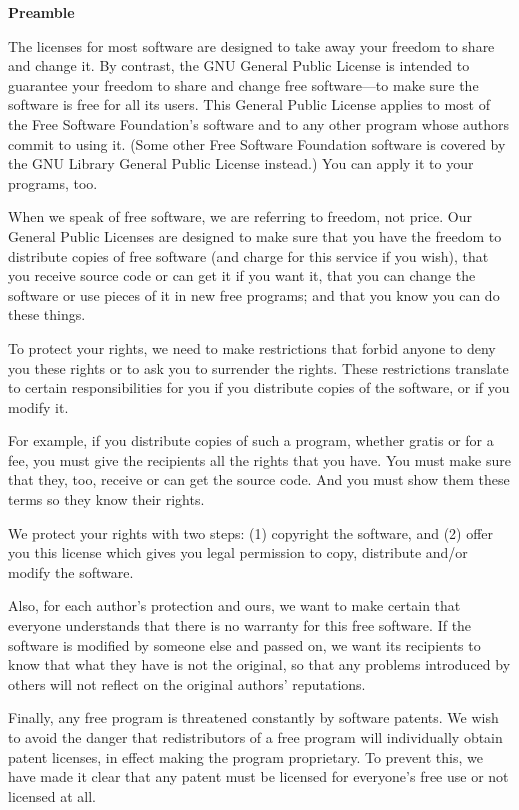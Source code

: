 \documentclass[a4paper,11pt,oneside]{book}
\begin{document}
\begin{center}
	{\bf\large Preamble}
\end{center}


The licenses for most software are designed to take away your freedom to
share and change it.  By contrast, the GNU General Public License is
intended to guarantee your freedom to share and change free software---to
make sure the software is free for all its users.  This General Public
License applies to most of the Free Software Foundation's software and to
any other program whose authors commit to using it.  (Some other Free
Software Foundation software is covered by the GNU Library General Public
License instead.)  You can apply it to your programs, too.

When we speak of free software, we are referring to freedom, not price.
Our General Public Licenses are designed to make sure that you have the
freedom to distribute copies of free software (and charge for this service
if you wish), that you receive source code or can get it if you want it,
that you can change the software or use pieces of it in new free programs;
and that you know you can do these things.

To protect your rights, we need to make restrictions that forbid anyone to
deny you these rights or to ask you to surrender the rights.  These
restrictions translate to certain responsibilities for you if you
distribute copies of the software, or if you modify it.

For example, if you distribute copies of such a program, whether gratis or
for a fee, you must give the recipients all the rights that you have.  You
must make sure that they, too, receive or can get the source code.  And
you must show them these terms so they know their rights.

We protect your rights with two steps: (1) copyright the software, and (2)
offer you this license which gives you legal permission to copy,
distribute and/or modify the software.

Also, for each author's protection and ours, we want to make certain that
everyone understands that there is no warranty for this free software.  If
the software is modified by someone else and passed on, we want its
recipients to know that what they have is not the original, so that any
problems introduced by others will not reflect on the original authors'
reputations.

Finally, any free program is threatened constantly by software patents.
We wish to avoid the danger that redistributors of a free program will
individually obtain patent licenses, in effect making the program
proprietary.  To prevent this, we have made it clear that any patent must
be licensed for everyone's free use or not licensed at all.
\end{document}
